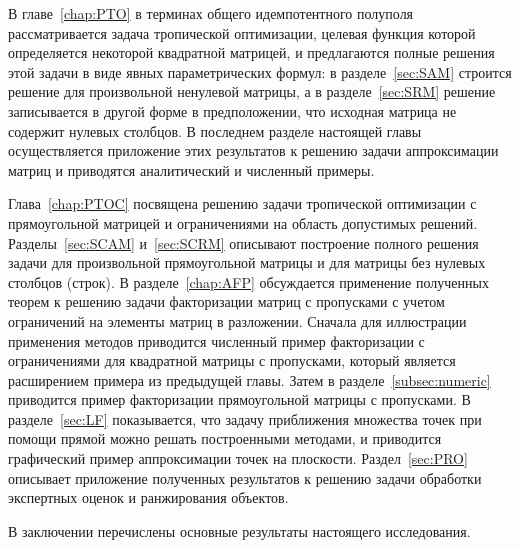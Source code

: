 \documentclass[specialist,
               substylefile = spbu.rtx,
               subf,href,colorlinks=true, 12pt]{disser}
\theoremstyle{definition}
\begin{document}
В главе~\ref{chap:PTO} в терминах общего идемпотентного полуполя рассматривается задача тропической оптимизации, целевая функция которой определяется некоторой квадратной матрицей, и предлагаются полные решения этой задачи в виде явных параметрических формул: в разделе~\ref{sec:SAM} строится решение для произвольной ненулевой матрицы, а в разделе~\ref{sec:SRM} решение записывается в другой форме в предположении, что исходная матрица не содержит нулевых столбцов. 
В последнем разделе настоящей главы осуществляется приложение этих результатов к решению задачи аппроксимации матриц и приводятся аналитический и численный примеры.

Глава~\ref{chap:PTOC} посвящена решению задачи тропической оптимизации с прямоугольной матрицей и ограничениями на область допустимых решений.
Разделы~\ref{sec:SCAM} и~\ref{sec:SCRM} описывают построение полного решения задачи для произвольной прямоугольной матрицы и для матрицы без нулевых столбцов (строк). В разделе~\ref{chap:AFP} обсуждается применение полученных теорем к решению задачи факторизации матриц с пропусками с учетом ограничений на элементы матриц в разложении. Сначала для иллюстрации применения методов приводится численный пример факторизации с ограничениями для квадратной матрицы с пропусками, который является расширением примера из предыдущей главы. Затем в разделе~\ref{subsec:numeric} приводится пример факторизации прямоугольной матрицы с пропусками. В разделе~\ref{sec:LF} показывается, что задачу приближения множества точек при помощи прямой можно решать построенными методами, и приводится графический пример аппроксимации точек на плоскости. Раздел~\ref{sec:PRO} описывает приложение полученных результатов к решению задачи обработки экспертных оценок и ранжирования объектов. %

В заключении перечислены основные результаты настоящего исследования.
\end{document}
